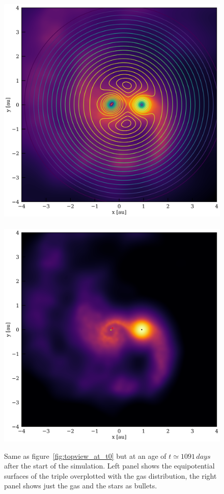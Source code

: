 \documentclass{aastex62}
\begin{document}
\begin{figure}[ht!]
  \includegraphics[width=0.49\columnwidth]{fig_BBSS_Lgas_M14Msun_A010au_t3360.pdf}
~  \includegraphics[width=0.51\columnwidth]{fig_BBSS_gas_M14Msun_A010au_t3360.pdf}
\caption{Same as figure~\ref{fig:topview_at_t0} but at an age of $t
  \simeq 1091\,days$ after the start of the simulation. Left panel
  shows the equipotential surfaces of the triple overplotted with the
  gas distribution, the right panel shows just the gas and the stars
  as bullets.
\label{fig:topview_at_t1000day}}
\end{figure}
\end{document}
